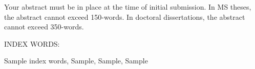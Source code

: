 Your abstract must be in place at the time of initial submission. In MS theses, the abstract cannot exceed 150-words. In doctoral dissertations, the abstract cannot exceed 350-words. 


\begin{singlespace}
\vspace{0.5in}
\noindent INDEX WORDS:
\hspace{0.2in}
\parbox[t]{4.5in}{
Sample index words, Sample, Sample, Sample}
\end{singlespace} 